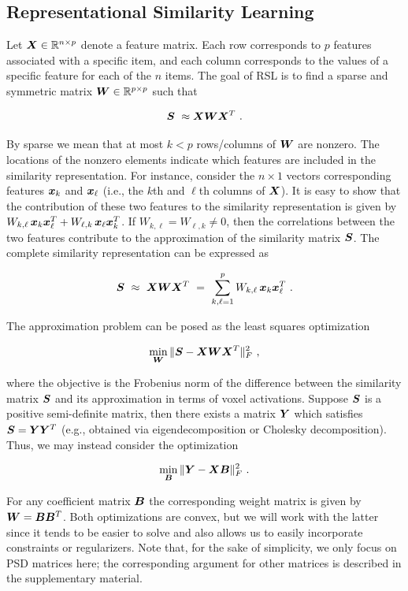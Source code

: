 \subsection{Representational Similarity Learning}

Let $\boldsymbol{X} \in {\mathbb R}^{n\times p}$ denote a feature matrix. Each row corresponds to
$p$ features associated with a specific item, and each column corresponds to the
values of a specific feature for each of the $n$ items. The goal of RSL is to
find a sparse and symmetric matrix $\boldsymbol{W}\in {\mathbb R}^{p\times p}$ such that

$$\bS \ \approx \bX \bW \bX^T \ .$$

By sparse we mean that at most $k<p$ rows/columns of $\boldsymbol{W}$ are nonzero. The
locations of the nonzero elements indicate which features are included in the
similarity representation. For instance, consider the $n\times 1$ vectors
corresponding features $\boldsymbol{x}_k$ and $\boldsymbol{x}_{\ell}$ (i.e., the $k$th and $\ell$th
columns of $\boldsymbol{X}$). It is easy to show that the contribution of these two
features to the similarity representation is given by $ W_{k,\ell} \, \boldsymbol{x}_k
\boldsymbol{x}_{\ell}^T + W_{\ell,k} \, \boldsymbol{x}_\ell \boldsymbol{x}_{k}^T$. If $W_{k,\ell}=W_{\ell,k}\neq
0$, then the correlations between the two features contribute to the
approximation of the similarity matrix $\boldsymbol{S}$. The complete similarity
representation can be expressed as

$$\bS \ \approx \ \bX\bW\bX^T \ = \ \sum_{k,\ell=1}^p W_{k,\ell} \, \bx_k \bx_{\ell}^T \ .$$

The approximation problem can be posed as the least squares optimization

$$\min_{\bW} \|\bS-\bX\bW\bX^T\|_F^2 \ , $$

where the objective is the Frobenius norm of the difference between the
similarity matrix $\boldsymbol{S}$ and its approximation in terms of voxel activations.
Suppose $\boldsymbol{S}$ is a positive semi-definite matrix, then there exists a matrix
$\boldsymbol{Y}$ which satisfies $\boldsymbol{S}=\boldsymbol{Y}\boldsymbol{Y}^T$ (e.g., obtained via eigendecomposition or
Cholesky decomposition). Thus, we may instead consider the optimization

$$\min_{\bB} \|\bY-\bX\bB\|_F^2 \ . $$

For any coefficient matrix $\boldsymbol{B}$ the corresponding weight matrix is given by
$\boldsymbol{W} = \boldsymbol{B}\boldsymbol{B}^T$. Both optimizations are convex, but we will work with the
latter since it tends to be easier to solve and also allows us to easily
incorporate constraints or regularizers. Note that, for the sake of simplicity,
we only focus on PSD matrices here; the corresponding argument for other
matrices is described in the supplementary material.

